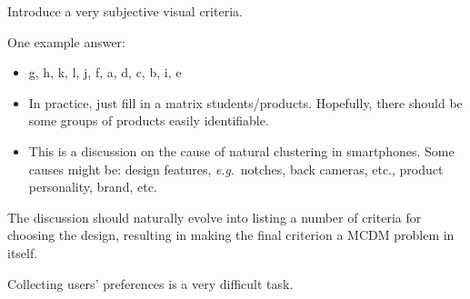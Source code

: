 \documentclass[answers, 10pt, UKenglish]{exam}
\begin{document}
\begin{questions}

	\begin{solutionorbox}
	{
		\color{red}

		Introduce a very subjective visual criteria.

		One example answer: 
		\begin{itemize}
			\item g, h, k, l, j, f, a, d, c, b, i, e
			\item In practice, just fill in a matrix
				students/products. Hopefully, there should be
				some groups of products easily identifiable.
			\item This is a discussion on the cause of natural
				clustering in
				smartphones. Some causes might be: design
				features, \textit{e}.\textit{g}.\ notches, back
				cameras, etc., product personality, brand, etc.
		\end{itemize}

		The discussion should naturally evolve into listing a number of
		criteria for choosing the design, resulting in making the final
		criterion a MCDM problem in itself. 

		Collecting users' preferences is a very difficult task.

	}
	\end{solutionorbox}
\end{questions}
\end{document}
